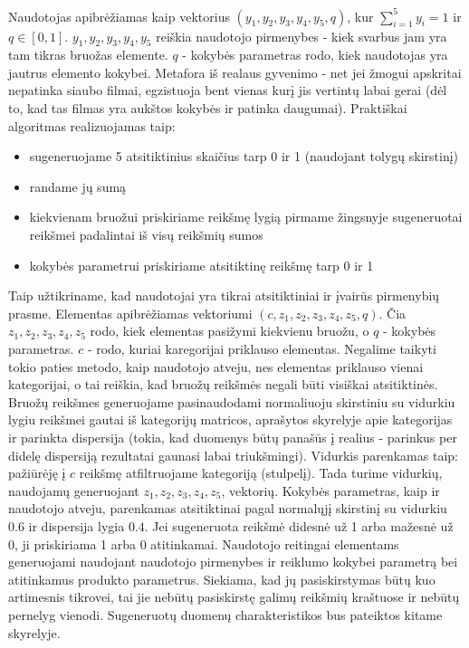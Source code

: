 \documentclass{VUMIFInfMagistrinis}
\begin{document}
\indent
Naudotojas apibrėžiamas kaip vektorius $(y_1, y_2, y_3, y_4, y_5, q)$, kur $\sum\limits_{i=1}^{5} y_i = 1$ ir $q\in[0,1]$. $y_1, y_2, y_3, y_4, y_5$ reiškia naudotojo pirmenybes - kiek svarbus jam yra tam tikras bruožas elemente.
$q$ - kokybės parametras rodo, kiek naudotojas yra jautrus elemento kokybei. Metafora iš realaus gyvenimo - net jei žmogui apskritai nepatinka siaubo filmai, egzistuoja bent vienas kurį jis vertintų labai gerai (dėl to, kad tas filmas yra aukštos kokybės ir patinka daugumai). 
\newline
\indent 
Praktiškai algoritmas realizuojamas taip:
\begin{itemize}
	\item sugeneruojame 5 atsitiktinius skaičius tarp 0 ir 1 (naudojant tolygų skirstinį)
	\item randame jų sumą
	\item kiekvienam bruožui priskiriame reikšmę lygią pirmame žingsnyje sugeneruotai reikšmei padalintai iš visų reikšmių sumos
	\item kokybės parametrui priskiriame atsitiktinę reikšmę tarp 0 ir 1
\end{itemize}
Taip užtikriname, kad naudotojai yra tikrai atsitiktiniai ir įvairūs pirmenybių prasme.
\indent
Elementas apibrėžiamas vektoriumi $(c, z_1, z_2, z_3, z_4, z_5, q)$. Čia $z_1, z_2, z_3, z_4, z_5$ rodo, kiek elementas pasižymi kiekvienu bruožu, o $q$ - kokybės parametras. $c$ - rodo, kuriai karegorijai priklauso elementas. Negalime taikyti tokio paties metodo, kaip naudotojo atveju, nes elementas priklauso vienai kategorijai, o tai reiškia, kad bruožų reikšmės negali būti visiškai atsitiktinės. Bruožų reikšmes generuojame pasinaudodami normaliuoju skirstiniu su vidurkiu lygiu reikšmei gautai iš kategorijų matricos, aprašytos skyrelyje apie kategorijas ir parinkta dispersija (tokia, kad duomenys būtų panašūs į realius - parinkus per didelę dispersiją rezultatai gaunasi labai triukšmingi). Vidurkis parenkamas taip: pažiūrėję į $c$ reikšmę atfiltruojame kategoriją (stulpelį). Tada turime vidurkių, naudojamų generuojant $z_1, z_2, z_3, z_4, z_5$, vektorių. Kokybės parametras, kaip ir naudotojo atveju, parenkamas atsitiktinai pagal normalųjį skirstinį su vidurkiu $0.6$ ir dispersija lygia $0.4$. Jei sugeneruota reikšmė didesnė už 1 arba mažesnė už 0, ji priskiriama 1 arba 0 atitinkamai.
\indent
Naudotojo reitingai elementams generuojami naudojant naudotojo pirmenybes ir reiklumo kokybei parametrą bei atitinkamus produkto parametrus. Siekiama, kad jų pasiskirstymas būtų kuo artimesnis tikrovei, tai jie nebūtų pasiskirstę galimų reikšmių kraštuose ir nebūtų pernelyg vienodi. Sugeneruotų duomenų charakteristikos bus pateiktos kitame skyrelyje. 
\end{document}
